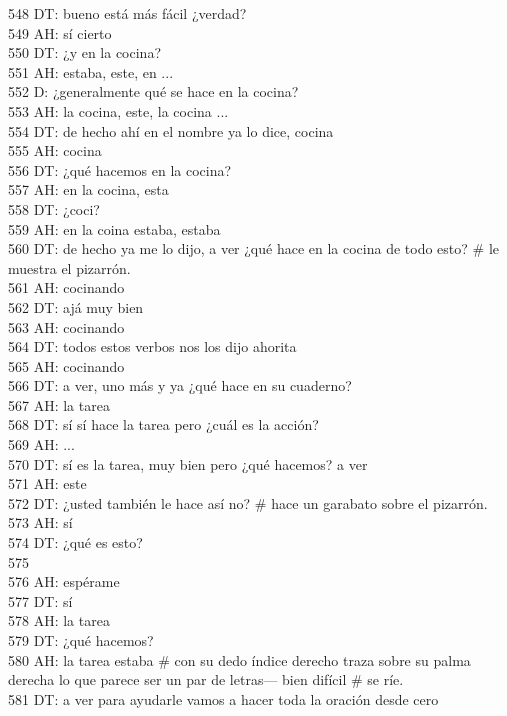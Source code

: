 548 DT: bueno está más fácil ¿verdad?\\
549 AH: sí cierto\\
550 DT: ¿y en la cocina?\\
551 AH: estaba, este, en ...\\
552 D: ¿generalmente qué se hace en la cocina?\\
553 AH: la cocina, este, la cocina ...\\
554 DT: de hecho ahí en el nombre ya lo dice, cocina\\
555 AH: cocina\\
556 DT: ¿qué hacemos en la cocina?\\
557 AH: en la cocina, esta\\
558 DT: ¿coci?\\
559 AH: en la coina estaba, estaba\\
560 DT: de hecho ya me lo dijo, a ver ¿qué hace en la cocina de todo esto? \# le muestra el pizarrón.\\
561 AH: cocinando\\
562 DT: ajá muy bien\\
563 AH: cocinando\\
564 DT: todos estos verbos nos los dijo ahorita\\
565 AH: cocinando\\
566 DT: a ver, uno más y ya ¿qué hace en su cuaderno?\\
567 AH: la tarea\\
568 DT: sí sí hace la tarea pero ¿cuál es la acción?\\
569 AH: ...\\
570 DT: sí es la tarea, muy bien pero ¿qué hacemos? a ver\\
571 AH: este\\
572 DT: ¿usted también le hace así no? \# hace un garabato sobre el pizarrón.\\
573 AH: sí\\
574 DT: ¿qué es esto?\\
575 \\
576 AH: espérame\\
577 DT: sí\\
578 AH: la tarea\\
579 DT: ¿qué hacemos?\\
580 AH: la tarea estaba \# con su dedo índice derecho traza sobre su palma derecha lo que parece ser un par de letras--- bien difícil \# se ríe.\\
581 DT: a ver para ayudarle vamos a hacer toda la oración desde cero\\
